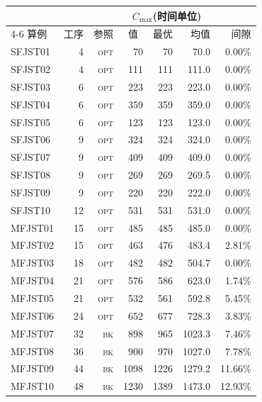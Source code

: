 \begin{tabular}{lrrrrrr}
\toprule
& & & \multicolumn{3}{c}{$C_{\max}$(时间单位)} & \\
\cmidrule(lr){4-6}
算例 & 工序 & 参照 & \multicolumn{1}{c}{值} & 最优 & 均值 & 间隙 \\
\midrule
SFJST01 & 4 & \textsc{opt} & 70 & 70\rlap{$^*$} & 70.0 & 0.00\% \\
SFJST02 & 4 & \textsc{opt} & 111 & 111\rlap{$^*$} & 111.0 & 0.00\% \\
SFJST03 & 6 & \textsc{opt} & 223 & 223\rlap{$^*$} & 223.0 & 0.00\% \\
SFJST04 & 6 & \textsc{opt} & 359 & 359\rlap{$^*$} & 359.0 & 0.00\% \\
SFJST05 & 6 & \textsc{opt} & 123 & 123\rlap{$^*$} & 123.0 & 0.00\% \\
SFJST06 & 9 & \textsc{opt} & 324 & 324\rlap{$^*$} & 324.0 & 0.00\% \\
SFJST07 & 9 & \textsc{opt} & 409 & 409\rlap{$^*$} & 409.0 & 0.00\% \\
SFJST08 & 9 & \textsc{opt} & 269 & 269\rlap{$^*$} & 269.5 & 0.00\% \\
SFJST09 & 9 & \textsc{opt} & 220 & 220\rlap{$^*$} & 222.0 & 0.00\% \\
SFJST10 & 12 & \textsc{opt} & 531 & 531\rlap{$^*$} & 531.0 & 0.00\% \\
MFJST01 & 15 & \textsc{opt} & 485 & 485\rlap{$^*$} & 485.0 & 0.00\% \\
MFJST02 & 15 & \textsc{opt} & 463 & 476 & 483.4 & 2.81\% \\
MFJST03 & 18 & \textsc{opt} & 482 & 482\rlap{$^*$} & 504.7 & 0.00\% \\
MFJST04 & 21 & \textsc{opt} & 576 & 586 & 623.0 & 1.74\% \\
MFJST05 & 21 & \textsc{opt} & 532 & 561 & 592.8 & 5.45\% \\
MFJST06 & 24 & \textsc{opt} & 652 & 677 & 728.3 & 3.83\% \\
MFJST07 & 32 & \textsc{bk} & 898 & 965 & 1023.3 & 7.46\% \\
MFJST08 & 36 & \textsc{bk} & 900 & 970 & 1027.0 & 7.78\% \\
MFJST09 & 44 & \textsc{bk} & 1098 & 1226 & 1279.2 & 11.66\% \\
MFJST10 & 48 & \textsc{bk} & 1230 & 1389 & 1473.0 & 12.93\% \\
\bottomrule
\end{tabular}
